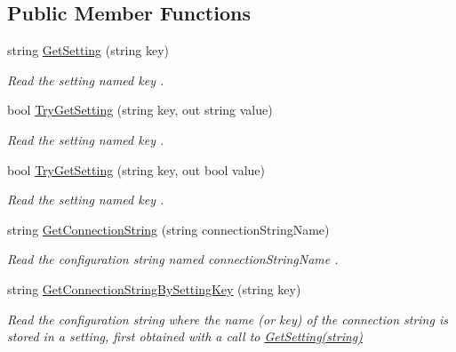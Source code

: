 \subsection*{Public Member Functions}
\begin{DoxyCompactItemize}
\item 
string \hyperlink{interfaceCqrs_1_1Configuration_1_1IConfigurationManager_a9f7b7d4d8c26a0589f01c8a7f69901ef_a9f7b7d4d8c26a0589f01c8a7f69901ef}{Get\+Setting} (string key)
\begin{DoxyCompactList}\small\item\em Read the setting named {\itshape key} . \end{DoxyCompactList}\item 
bool \hyperlink{interfaceCqrs_1_1Configuration_1_1IConfigurationManager_ac4478405e3d9e1c97d14953aea4e695b_ac4478405e3d9e1c97d14953aea4e695b}{Try\+Get\+Setting} (string key, out string value)
\begin{DoxyCompactList}\small\item\em Read the setting named {\itshape key} . \end{DoxyCompactList}\item 
bool \hyperlink{interfaceCqrs_1_1Configuration_1_1IConfigurationManager_a8389181330999fcb8e30af4dbb56d35e_a8389181330999fcb8e30af4dbb56d35e}{Try\+Get\+Setting} (string key, out bool value)
\begin{DoxyCompactList}\small\item\em Read the setting named {\itshape key} . \end{DoxyCompactList}\item 
string \hyperlink{interfaceCqrs_1_1Configuration_1_1IConfigurationManager_afbfde09d3caec88138c5a08c84539c34_afbfde09d3caec88138c5a08c84539c34}{Get\+Connection\+String} (string connection\+String\+Name)
\begin{DoxyCompactList}\small\item\em Read the configuration string named {\itshape connection\+String\+Name} . \end{DoxyCompactList}\item 
string \hyperlink{interfaceCqrs_1_1Configuration_1_1IConfigurationManager_a39de4f0a619d943c44b63b2a9b98e983_a39de4f0a619d943c44b63b2a9b98e983}{Get\+Connection\+String\+By\+Setting\+Key} (string key)
\begin{DoxyCompactList}\small\item\em Read the configuration string where the name (or key) of the connection string is stored in a setting, first obtained with a call to \hyperlink{interfaceCqrs_1_1Configuration_1_1IConfigurationManager_a9f7b7d4d8c26a0589f01c8a7f69901ef_a9f7b7d4d8c26a0589f01c8a7f69901ef}{Get\+Setting(string)} \end{DoxyCompactList}\end{DoxyCompactItemize}


